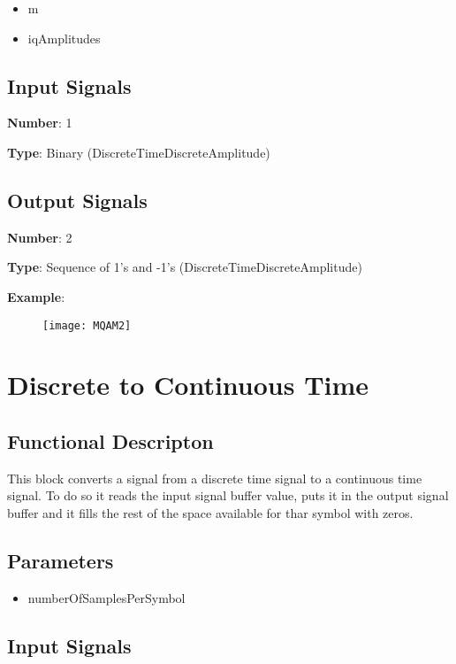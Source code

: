 \documentclass[a4paper]{article}
\begin{document}
\begin{itemize}
	\item m 
	\item iqAmplitudes 
\end{itemize}


\subsection*{Input Signals}

\textbf{Number}: 1

\textbf{Type}: Binary (DiscreteTimeDiscreteAmplitude)

\subsection*{Output Signals}

\textbf{Number}: 2

\textbf{Type}: Sequence of 1's and -1's (DiscreteTimeDiscreteAmplitude)

\textbf{Example}:

\begin{figure}
	\texttt{[image: MQAM2]}
\end{figure}

\pagebreak

\section{Discrete to Continuous Time}

\subsection*{Functional Descripton}

This block converts a signal from a discrete time signal to a continuous time signal. To do so it reads the input signal buffer value, puts it in the output signal buffer and it fills the rest of the space available for thar symbol with zeros.

\subsection*{Parameters}

\begin{itemize}
	\item numberOfSamplesPerSymbol 
\end{itemize}


\subsection*{Input Signals}
\end{document}
